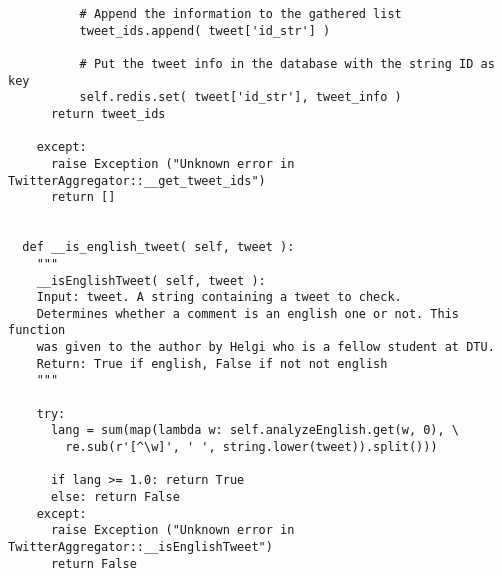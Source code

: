 \begin{verbatim}
          # Append the information to the gathered list
          tweet_ids.append( tweet['id_str'] )
          
          # Put the tweet info in the database with the string ID as key
          self.redis.set( tweet['id_str'], tweet_info )
      return tweet_ids
    
    except:
      raise Exception ("Unknown error in TwitterAggregator::__get_tweet_ids")
      return []
  
  
  def __is_english_tweet( self, tweet ):
    """
    __isEnglishTweet( self, tweet ):
    Input: tweet. A string containing a tweet to check.
    Determines whether a comment is an english one or not. This function 
    was given to the author by Helgi who is a fellow student at DTU.
    Return: True if english, False if not not english
    """
    
    try:
      lang = sum(map(lambda w: self.analyzeEnglish.get(w, 0), \
        re.sub(r'[^\w]', ' ', string.lower(tweet)).split()))
        
      if lang >= 1.0: return True
      else: return False
    except:
      raise Exception ("Unknown error in TwitterAggregator::__isEnglishTweet")
      return False









\end{verbatim}

